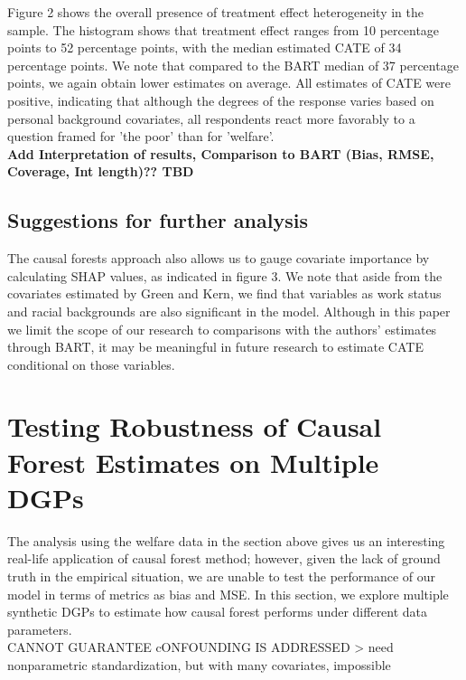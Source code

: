 \documentclass[12pt]{article}
\begin{document}
Figure 2 shows the overall presence of treatment effect heterogeneity in the sample. The histogram shows that treatment effect ranges from 10 percentage points to 52 percentage points, with the median estimated CATE of 34 percentage points. We note that compared to the BART median of 37 percentage points, we again obtain lower estimates on average. All estimates of CATE were positive, indicating that although the degrees of the response varies based on personal background covariates, all respondents react more favorably to a question framed for 'the poor' than for 'welfare'. \\

\textbf{Add Interpretation of results, Comparison to BART (Bias, RMSE, Coverage, Int length)?? TBD} 

\subsection{Suggestions for further analysis}
The causal forests approach also allows us to gauge covariate importance by calculating SHAP values, as indicated in figure 3.  We note that aside from the covariates estimated by Green and Kern, we find that variables as work status and racial backgrounds are also significant in the model. Although in this paper we limit the scope of our research to comparisons with the authors' estimates through BART, it may be meaningful in future research to estimate CATE conditional on those variables. \\







\section{Testing Robustness of Causal Forest Estimates on Multiple DGPs} 

The analysis using the welfare data in the section above gives us an interesting real-life application of causal forest method; however, given the lack of ground truth in the empirical situation, we are unable to test the performance of our model in terms of metrics as bias and MSE. In this section, we explore multiple synthetic DGPs to estimate how causal forest performs under different data parameters. \\

CANNOT GUARANTEE cONFOUNDING IS ADDRESSED > need nonparametric standardization, but with many covariates, impossible 
\end{document}

